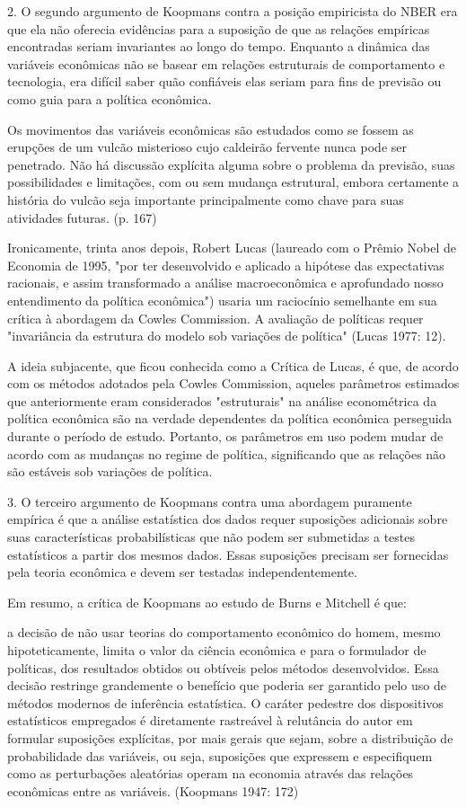 \documentclass[12pt]{article}
\begin{document}
2. O segundo argumento de Koopmans contra a posição empiricista do NBER era que ela não oferecia evidências para a suposição de que as relações empíricas encontradas seriam invariantes ao longo do tempo. Enquanto a dinâmica das variáveis econômicas não se basear em relações estruturais de comportamento e tecnologia, era difícil saber quão confiáveis elas seriam para fins de previsão ou como guia para a política econômica.

Os movimentos das variáveis econômicas são estudados como se fossem as erupções de um vulcão misterioso cujo caldeirão fervente nunca pode ser penetrado. Não há discussão explícita alguma sobre o problema da previsão, suas possibilidades e limitações, com ou sem mudança estrutural, embora certamente a história do vulcão seja importante principalmente como chave para suas atividades futuras. (p. 167)

Ironicamente, trinta anos depois, Robert Lucas (laureado com o Prêmio Nobel de Economia de 1995, "por ter desenvolvido e aplicado a hipótese das expectativas racionais, e assim transformado a análise macroeconômica e aprofundado nosso entendimento da política econômica") usaria um raciocínio semelhante em sua crítica à abordagem da Cowles Commission. A avaliação de políticas requer "invariância da estrutura do modelo sob variações de política" (Lucas 1977: 12).

A ideia subjacente, que ficou conhecida como a Crítica de Lucas, é que, de acordo com os métodos adotados pela Cowles Commission, aqueles parâmetros estimados que anteriormente eram considerados "estruturais" na análise econométrica da política econômica são na verdade dependentes da política econômica perseguida durante o período de estudo. Portanto, os parâmetros em uso podem mudar de acordo com as mudanças no regime de política, significando que as relações não são estáveis sob variações de política.

3. O terceiro argumento de Koopmans contra uma abordagem puramente empírica é que a análise estatística dos dados requer suposições adicionais sobre suas características probabilísticas que não podem ser submetidas a testes estatísticos a partir dos mesmos dados. Essas suposições precisam ser fornecidas pela teoria econômica e devem ser testadas independentemente.

Em resumo, a crítica de Koopmans ao estudo de Burns e Mitchell é que:

a decisão de não usar teorias do comportamento econômico do homem, mesmo hipoteticamente, limita o valor da ciência econômica e para o formulador de políticas, dos resultados obtidos ou obtíveis pelos métodos desenvolvidos. Essa decisão restringe grandemente o benefício que poderia ser garantido pelo uso de métodos modernos de inferência estatística. O caráter pedestre dos dispositivos estatísticos empregados é diretamente rastreável à relutância do autor em formular suposições explícitas, por mais gerais que sejam, sobre a distribuição de probabilidade das variáveis, ou seja, suposições que expressem e especifiquem como as perturbações aleatórias operam na economia através das relações econômicas entre as variáveis. (Koopmans 1947: 172)
\end{document}
